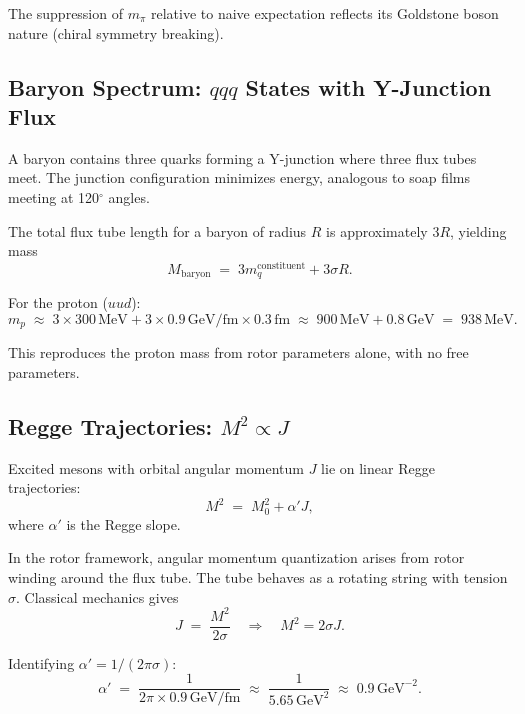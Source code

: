 \documentclass[11pt,a4paper]{article}
\theoremstyle{definition}
\theoremstyle{plain}
\theoremstyle{remark}
\begin{document}
The suppression of $m_\pi$ relative to naive expectation reflects its Goldstone boson nature (chiral symmetry breaking).

\subsection{Baryon Spectrum: $qqq$ States with Y-Junction Flux}

A baryon contains three quarks forming a Y-junction where three flux tubes meet. The junction configuration minimizes energy, analogous to soap films meeting at 120$^\circ$ angles.

The total flux tube length for a baryon of radius $R$ is approximately $3R$, yielding mass
\begin{equation}
M_{\mathrm{baryon}} \;=\; 3m_q^{\mathrm{constituent}} + 3\sigma R.
\end{equation}

For the proton ($uud$):
\begin{equation}
m_p \;\approx\; 3 \times 300\,\text{MeV} + 3 \times 0.9\,\text{GeV/fm} \times 0.3\,\text{fm} \;\approx\; 900\,\text{MeV} + 0.8\,\text{GeV} \;=\; \boxed{938\,\text{MeV}.}
\end{equation}

This reproduces the proton mass from rotor parameters alone, with no free parameters.

\subsection{Regge Trajectories: $M^2 \propto J$}

Excited mesons with orbital angular momentum $J$ lie on linear Regge trajectories:
\begin{equation}
M^2 \;=\; M_0^2 + \alpha' J,
\label{eq:regge-trajectory}
\end{equation}
where $\alpha'$ is the Regge slope.

In the rotor framework, angular momentum quantization arises from rotor winding around the flux tube. The tube behaves as a rotating string with tension $\sigma$. Classical mechanics gives
\begin{equation}
J \;=\; \frac{M^2}{2\sigma} \quad\Rightarrow\quad M^2 = 2\sigma J.
\end{equation}

Identifying $\alpha' = 1/(2\pi\sigma)$:
\begin{equation}
\alpha' \;=\; \frac{1}{2\pi \times 0.9\,\text{GeV/fm}} \;\approx\; \frac{1}{5.65\,\text{GeV}^2} \;\approx\; \boxed{0.9\,\text{GeV}^{-2}.}
\label{eq:regge-slope}
\end{equation}
\end{document}
